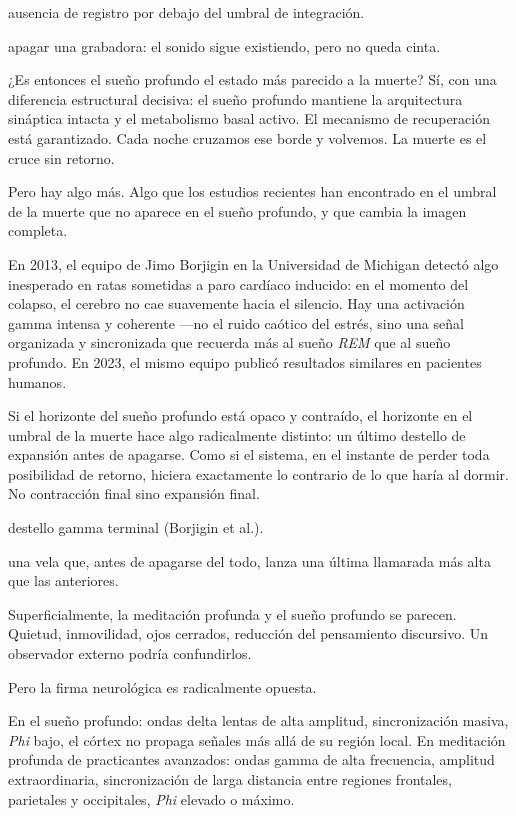 \begin{fisica}
 ausencia de registro por debajo del umbral de integración.

 apagar una grabadora: el sonido sigue existiendo, pero no queda cinta.
\end{fisica}
¿Es entonces el sueño profundo el estado más parecido a la muerte? Sí, con una diferencia estructural decisiva: el sueño profundo mantiene la arquitectura sináptica intacta y el metabolismo basal activo. El mecanismo de recuperación está garantizado. Cada noche cruzamos ese borde y volvemos. La muerte es el cruce sin retorno.

Pero hay algo más. Algo que los estudios recientes han encontrado en el umbral de la muerte que no aparece en el sueño profundo, y que cambia la imagen completa.

En 2013, el equipo de Jimo Borjigin en la Universidad de Michigan detectó algo inesperado en ratas sometidas a paro cardíaco inducido: en el momento del colapso, el cerebro no cae suavemente hacia el silencio. Hay una activación gamma intensa y coherente —no el ruido caótico del estrés, sino una señal organizada y sincronizada que recuerda más al sueño \emph{REM} que al sueño profundo. En 2023, el mismo equipo publicó resultados similares en pacientes humanos.

Si el horizonte del sueño profundo está opaco y contraído, el horizonte en el umbral de la muerte hace algo radicalmente distinto: un último destello de expansión antes de apagarse. Como si el sistema, en el instante de perder toda posibilidad de retorno, hiciera exactamente lo contrario de lo que haría al dormir. No contracción final sino expansión final.

\begin{fisica}
 destello gamma terminal (Borjigin et al.).

 una vela que, antes de apagarse del todo, lanza una última llamarada más alta que las anteriores.
\end{fisica}
\noindent Superficialmente, la meditación profunda y el sueño profundo se parecen. Quietud, inmovilidad, ojos cerrados, reducción del pensamiento discursivo. Un observador externo podría confundirlos.

Pero la firma neurológica es radicalmente opuesta.

En el sueño profundo: ondas delta lentas de alta amplitud, sincronización masiva, \emph{Phi} bajo, el córtex no propaga señales más allá de su región local. En meditación profunda de practicantes avanzados: ondas gamma de alta frecuencia, amplitud extraordinaria, sincronización de larga distancia entre regiones frontales, parietales y occipitales, \emph{Phi} elevado o máximo.

